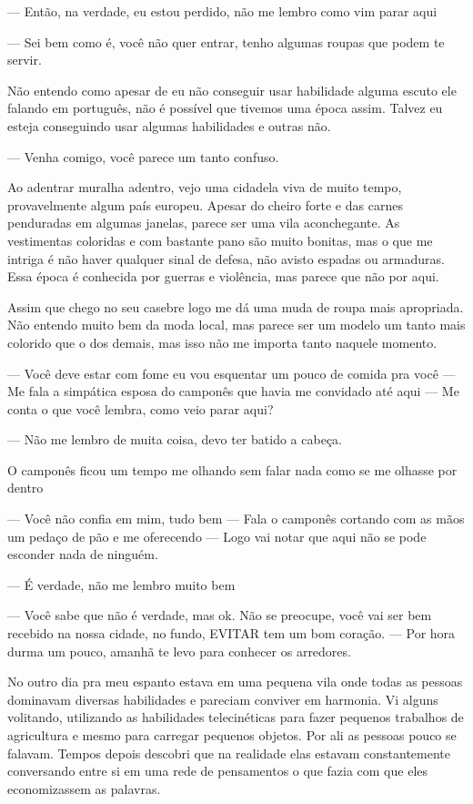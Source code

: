 — Então, na verdade, eu estou perdido, não me lembro como vim parar aqui

— Sei bem como é, você não quer entrar, tenho algumas roupas que podem te servir.

Não entendo como apesar de eu não conseguir usar habilidade alguma escuto ele falando em português, não é possível que tivemos uma época assim. Talvez eu esteja conseguindo usar algumas habilidades e outras não.

— Venha comigo, você parece um tanto confuso.

Ao adentrar muralha adentro, vejo uma cidadela viva de muito tempo, provavelmente algum país europeu. Apesar do cheiro forte e das carnes penduradas em algumas janelas, parece ser uma vila aconchegante. As vestimentas coloridas e com bastante pano são muito bonitas, mas o que me intriga é não haver qualquer sinal de defesa, não avisto espadas ou armaduras. Essa época é conhecida por guerras e violência, mas parece que não por aqui.

Assim que chego no seu casebre logo me dá uma muda de roupa mais apropriada. Não entendo muito bem da moda local, mas parece ser um modelo um tanto mais colorido que o dos demais, mas isso não me importa tanto naquele momento.

— Você deve estar com fome eu vou esquentar um pouco de comida pra você — Me fala a simpática esposa do camponês que havia me convidado até aqui
— Me conta o que você lembra, como veio parar aqui?

— Não me lembro de muita coisa, devo ter batido a cabeça.

O camponês ficou um tempo me olhando sem falar nada como se me olhasse por dentro

— Você não confia em mim, tudo bem — Fala o camponês cortando com as mãos um pedaço de pão e me oferecendo — Logo vai notar que aqui não se pode esconder nada de ninguém.

— É verdade, não me lembro muito bem

— Você sabe que não é verdade, mas ok. Não se preocupe, você vai ser bem recebido na nossa cidade, no fundo, EVITAR tem um bom coração. — Por hora durma um pouco, amanhã te levo para conhecer os arredores.

No outro dia pra meu espanto estava em uma pequena vila onde todas as pessoas dominavam diversas habilidades e pareciam conviver em harmonia. Vi alguns volitando, utilizando as habilidades telecinéticas para fazer pequenos trabalhos de agricultura e mesmo para carregar pequenos objetos. Por ali as pessoas pouco se falavam. Tempos depois descobri que na realidade elas estavam constantemente conversando entre si em uma rede de pensamentos o que fazia com que eles economizassem as palavras.


